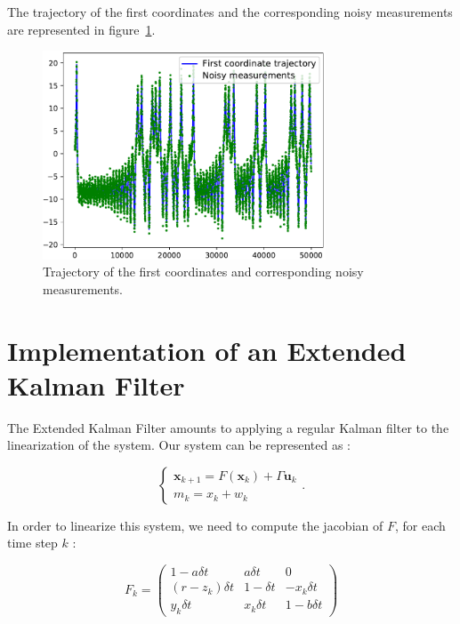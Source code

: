 \documentclass[english, DIV=13]{scrartcl}
\renewcommand{\vec}[1]{\mathbf{#1}}
\begin{document}
The trajectory of the first coordinates and the corresponding noisy measurements
are represented in figure~\ref{fig:q2-mes-vs-real}.

\begin{figure}[ht!]
    \centering
    \includegraphics[width=0.75\textwidth]{figures/q2-mes-vs-real}
    \caption{Trajectory of the first coordinates and corresponding noisy measurements.}
    \label{fig:q2-mes-vs-real}
\end{figure}


\section{Implementation of an Extended Kalman Filter}

The Extended Kalman Filter amounts to applying a regular Kalman filter to the linearization of the system. Our system can be represented as :


\begin{equation*}
    \begin{cases}
        \vec{x}_{k+1} = F(\vec{x}_k) + \Gamma\vec{u}_k \\
        m_k = x_k + w_k
    \end{cases}.
\end{equation*}

In order to linearize this system, we need to compute the jacobian of $F$, for each time step $k$ :

\begin{equation*}
F_k = 
    \begin{pmatrix}
        1 - a \delta t & a \delta t & 0 \\
        (r - z_k) \delta t & 1 - \delta t & - x_k \delta t \\
        y_k \delta t & x_k \delta t & 1 - b \delta t
    \end{pmatrix}
\end{equation*}
\end{document}

